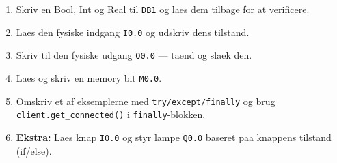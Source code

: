 \documentclass[12pt, a4paper]{article}
\begin{document}
\begin{tcolorbox}[tipbox, title={\faTasks\quad Oevelsesopgaver}]
\begin{enumerate}[leftmargin=1.5em, itemsep=6pt]
  \item Skriv en Bool, Int og Real til \texttt{DB1} og laes dem tilbage for at verificere.
  \item Laes den fysiske indgang \texttt{I0.0} og udskriv dens tilstand.
  \item Skriv til den fysiske udgang \texttt{Q0.0} --- taend og slaek den.
  \item Laes og skriv en memory bit \texttt{M0.0}.
  \item Omskriv et af eksemplerne med \texttt{try/except/finally} og brug
        \texttt{client.get\_connected()} i \texttt{finally}-blokken.
  \item \textbf{Ekstra:} Laes knap \texttt{I0.0} og styr lampe \texttt{Q0.0}
        baseret paa knappens tilstand (if/else).
\end{enumerate}
\end{tcolorbox}
\end{document}
